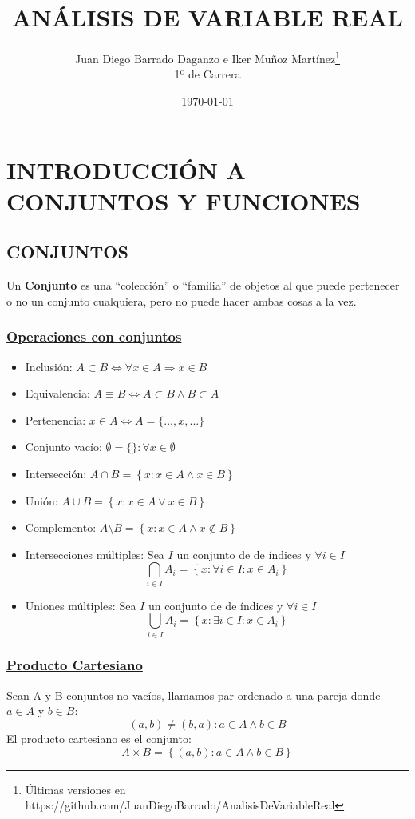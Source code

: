 \documentclass[10pt,a4paper,openright]{book}
\title{ANÁLISIS DE VARIABLE REAL}
\author{Juan Diego Barrado Daganzo e Iker Muñoz Martínez\footnote{Últimas versiones en https://github.com/JuanDiegoBarrado/AnalisisDeVariableReal}\\1º de Carrera} %
\date{\today}
\begin{document}
\maketitle

\mainmatter
\chapter*{INTRODUCCIÓN A CONJUNTOS Y FUNCIONES}
\section*{CONJUNTOS}
Un \textbf{Conjunto} es una ``colección'' o ``familia'' de objetos al que puede pertenecer o no un conjunto cualquiera, pero no puede hacer ambas cosas a la vez.
\subsection*{\underline{Operaciones con conjuntos}}
\begin{itemize}
\item Inclusión: $A\subset B \Leftrightarrow \forall x \in A \Rightarrow x \in B$
\item Equivalencia: $A \equiv B \Leftrightarrow A \subset B \wedge B \subset A$
\item Pertenencia: $x \in A \Leftrightarrow A=\{...,x,...\}$
\item Conjunto vacío: $\emptyset=\{\}: \forall x \in \emptyset$
\item Intersección: $A \cap B=\left\lbrace x: x\in A \wedge x\in B \right\rbrace$
\item Unión: $A \cup B=\left\lbrace x: x\in A \vee x\in B \right\rbrace$
\item Complemento: $A \mbox{\textbackslash} B=\left\lbrace x: x\in A \wedge x\notin B \right\rbrace$
\item Intersecciones múltiples: Sea $I$ un conjunto de de índices y $\forall i \in I$
$$\bigcap_{i\in I}A_i=\left\lbrace x: \forall i \in I : x\in A_i\right\rbrace$$
\item Uniones múltiples: Sea $I$ un conjunto de de índices y $\forall i \in I$
$$\bigcup_{i\in I}A_i=\left\lbrace x: \exists i \in I: x\in A_i\right\rbrace$$
\end{itemize}

\subsection*{\underline{Producto Cartesiano}}
Sean A y B conjuntos no vacíos, llamamos par ordenado a una pareja donde $a \in A$ y $b \in B$:
$$(a,b)\neq (b,a) : a\in A \wedge b\in B$$
El producto cartesiano es el conjunto:
$$A\times B=\left\lbrace (a,b) : a \in A \wedge b \in B\right\rbrace$$
\end{document}
